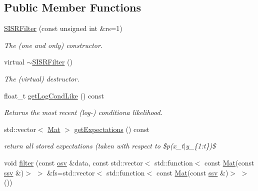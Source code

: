 \subsection*{Public Member Functions}
\begin{DoxyCompactItemize}
\item 
\hyperlink{classSISRFilter_a46243d4a5ef93f3762d1130fa4d43389}{S\+I\+S\+R\+Filter} (const unsigned int \&rs=1)
\begin{DoxyCompactList}\small\item\em The (one and only) constructor. \end{DoxyCompactList}\item 
\mbox{\label{classSISRFilter_a0934886c2ab47682364e3624c24be874}} 
virtual \hyperlink{classSISRFilter_a0934886c2ab47682364e3624c24be874}{$\sim$\+S\+I\+S\+R\+Filter} ()
\begin{DoxyCompactList}\small\item\em The (virtual) destructor. \end{DoxyCompactList}\item 
float\+\_\+t \hyperlink{classSISRFilter_a48bdb88b2ed4041ab6d8a6547703ebf3}{get\+Log\+Cond\+Like} () const
\begin{DoxyCompactList}\small\item\em Returns the most recent (log-\/) conditiona likelihood. \end{DoxyCompactList}\item 
std\+::vector$<$ \hyperlink{classSISRFilter_a7355e966778c788dfe227ef5254677c4}{Mat} $>$ \hyperlink{classSISRFilter_a88ef9409ded3ec7e6745e184daad86c4}{get\+Expectations} () const
\begin{DoxyCompactList}\small\item\em return all stored expectations (taken with respect to \$p(x\+\_\+t$\vert$y\+\_\+\{1\+:t\})\$ \end{DoxyCompactList}\item 
void \hyperlink{classSISRFilter_a0fd4ac5135ff9a4bb32a286533855197}{filter} (const \hyperlink{classSISRFilter_a5b762e9352857a9e48db3932191887ef}{osv} \&data, const std\+::vector$<$ std\+::function$<$ const \hyperlink{classSISRFilter_a7355e966778c788dfe227ef5254677c4}{Mat}(const \hyperlink{classSISRFilter_abfec45cf57ea6fadae4a9da8b0042351}{ssv} \&)$>$ $>$ \&fs=std\+::vector$<$ std\+::function$<$ const \hyperlink{classSISRFilter_a7355e966778c788dfe227ef5254677c4}{Mat}(const \hyperlink{classSISRFilter_abfec45cf57ea6fadae4a9da8b0042351}{ssv} \&)$>$ $>$())

\end{DoxyCompactItemize}
